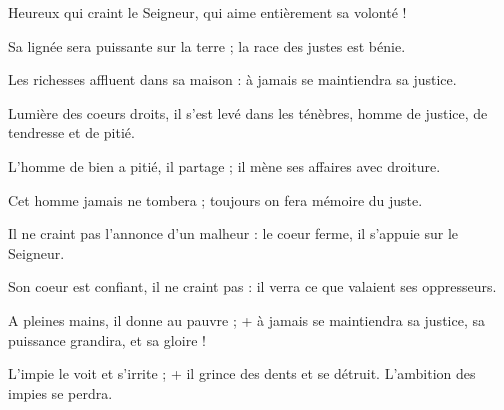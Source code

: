 \item Heureux qui craint le Seigneur, qui aime entièrement sa volonté !

\item Sa lignée sera puissante sur la terre ; la race des justes est bénie.

\item Les richesses affluent dans sa maison : à jamais se maintiendra sa justice.

\item Lumière des coeurs droits, il s'est levé dans les ténèbres, homme de justice, de tendresse et de pitié.

\item L'homme de bien a pitié, il partage ; il mène ses affaires avec droiture.

\item Cet homme jamais ne tombera ; toujours on fera mémoire du juste.

\item Il ne craint pas l'annonce d'un malheur : le coeur ferme, il s'appuie sur le Seigneur.

\item Son coeur est confiant, il ne craint pas : il verra ce que valaient ses oppresseurs.

\item A pleines mains, il donne au pauvre ; + à jamais se maintiendra sa justice, sa puissance grandira, et sa gloire !

\item L'impie le voit et s'irrite ; + il grince des dents et se détruit. L'ambition des impies se perdra.
